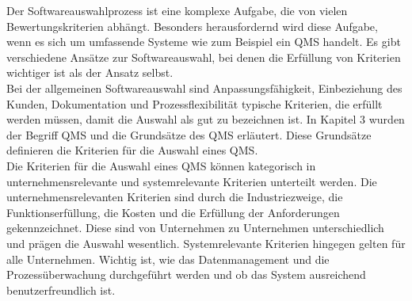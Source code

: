 \documentclass[11pt]{scrartcl}       %
\begin{document}
Der Softwareauswahlprozess ist eine komplexe Aufgabe, die von vielen Bewertungskriterien abhängt. Besonders herausfordernd wird diese Aufgabe, wenn es sich um umfassende Systeme wie zum Beispiel ein QMS handelt. Es gibt verschiedene Ansätze zur Softwareauswahl, bei denen die Erfüllung von Kriterien wichtiger ist als der Ansatz selbst.\\

Bei der allgemeinen Softwareauswahl sind Anpassungsfähigkeit, Einbeziehung des Kunden, Dokumentation und Prozessflexibilität typische Kriterien, die erfüllt werden müssen, damit die Auswahl als gut zu bezeichnen ist. In Kapitel 3 wurden der Begriff QMS und die Grundsätze des QMS erläutert. Diese Grundsätze definieren die Kriterien für die Auswahl eines QMS.\\

Die Kriterien für die Auswahl eines QMS können kategorisch in unternehmensrelevante und systemrelevante Kriterien unterteilt werden. Die unternehmensrelevanten Kriterien sind durch die Industriezweige, die Funktionserfüllung, die Kosten und die Erfüllung der Anforderungen gekennzeichnet. Diese sind von Unternehmen zu Unternehmen unterschiedlich und prägen die Auswahl wesentlich. Systemrelevante Kriterien hingegen gelten für alle Unternehmen. Wichtig ist, wie das Datenmanagement und die Prozessüberwachung durchgeführt werden und ob das System ausreichend benutzerfreundlich ist.\\




\newpage
{}
{}
\printbibliography
\end{document}

